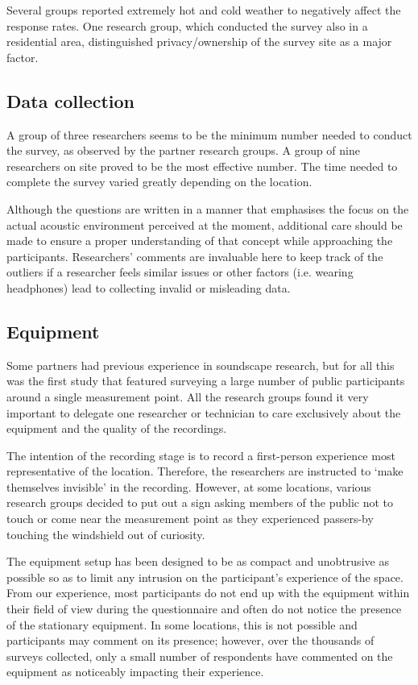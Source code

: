    Several groups reported extremely hot and cold weather to negatively affect the response rates. One research group, which conducted the survey also in a residential area, distinguished privacy/ownership of the survey site as a major factor.

 \subsection{Data collection}

   A group of three researchers seems to be the minimum number needed to conduct the survey, as observed by the partner research groups. A group of nine researchers on site proved to be the most effective number. The time needed to complete the survey varied greatly depending on the location.

   Although the questions are written in a manner that emphasises the focus on the actual acoustic environment perceived at the moment, additional care should be made to ensure a proper understanding of that concept while approaching the participants. Researchers' comments are invaluable here to keep track of the outliers if a researcher feels similar issues or other factors (i.e. wearing headphones) lead to collecting invalid or misleading data.

 \subsection{Equipment}

   Some partners had previous experience in soundscape research, but for all this was the first study that featured surveying a large number of public participants around a single measurement point. All the research groups found it very important to delegate one researcher or technician to care exclusively about the equipment and the quality of the recordings.

   The intention of the recording stage is to record a first-person experience most representative of the location. Therefore, the researchers are instructed to `make themselves invisible' in the recording. However, at some locations, various research groups decided to put out a sign asking members of the public not to touch or come near the measurement point as they experienced passers-by touching the windshield out of curiosity.

   The equipment setup has been designed to be as compact and unobtrusive as possible so as to limit any intrusion on the participant's experience of the space. From our experience, most participants do not end up with the equipment within their field of view during the questionnaire and often do not notice the presence of the stationary equipment. In some locations, this is not possible and participants may comment on its presence; however, over the thousands of surveys collected, only a small number of respondents have commented on the equipment as noticeably impacting their experience.

